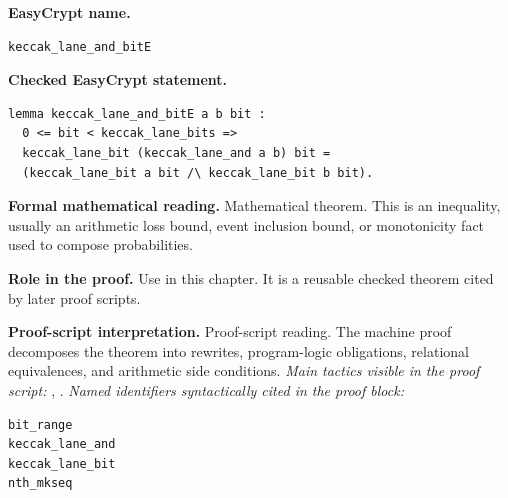 \begin{formaltheorem}
\noindent\textbf{EasyCrypt name.}
\begin{lstlisting}[language=EasyCrypt,basicstyle=\ttfamily\scriptsize]
keccak_lane_and_bitE
\end{lstlisting}
\noindent\textbf{Checked EasyCrypt statement.}
\begin{lstlisting}[language=EasyCrypt,basicstyle=\ttfamily\scriptsize]
lemma keccak_lane_and_bitE a b bit :
  0 <= bit < keccak_lane_bits =>
  keccak_lane_bit (keccak_lane_and a b) bit =
  (keccak_lane_bit a bit /\ keccak_lane_bit b bit).
\end{lstlisting}
\noindent\textbf{Formal mathematical reading.}
Mathematical theorem. This is an inequality, usually an arithmetic loss bound, event inclusion bound, or monotonicity fact used to compose probabilities.

\noindent\textbf{Role in the proof.}
Use in this chapter. It is a reusable checked theorem cited by later proof scripts.

\noindent\textbf{Proof-script interpretation.}
Proof-script reading. The machine proof decomposes the theorem into rewrites, program-logic obligations, relational equivalences, and arithmetic side conditions.
\emph{Main tactics visible in the proof script:} , .
\emph{Named identifiers syntactically cited in the proof block:}
\begin{lstlisting}[language=EasyCrypt,basicstyle=\ttfamily\scriptsize]
bit_range
keccak_lane_and
keccak_lane_bit
nth_mkseq
\end{lstlisting}

\end{formaltheorem}

